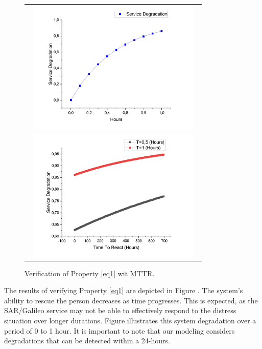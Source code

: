 \noindent
    \begin{figure}[!htb]
    \centering
       \begin{tabularx}{\linewidth}{ m{8cm} }
           
\noindent
 \begin{minipage}[t]{8cm}
     \centering

    \includegraphics[width=250pt, height =180pt]{Graph2.pdf}
    \caption{Verification of Property \ref{eq1}.}
    \label{fig:01}
   \end{minipage}
    
          \\
\noindent
   \begin{minipage}[t]{8cm}
     \centering
   		\includegraphics[width=250pt, height =180pt]{Graph1.pdf}
    \caption{Verification of Property \ref{eq1} wit MTTR.}
    \label{fig:02}
   \end{minipage}

               \end{tabularx}
\end{figure}

The results of verifying Property \ref{eq1} are depicted in Figure . The system's ability to rescue the person decreases as time progresses. This is expected, as the SAR/Galileo service may not be able to effectively respond to the distress situation over longer durations. Figure  illustrates this system degradation over a period of 0 to 1 hour. It is important to note that our modeling considers degradations that can be detected within a 24-hours.

